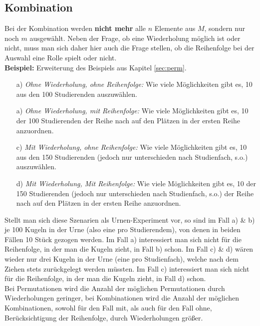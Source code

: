 \documentclass[a4paper]{article}
\newcommand\dangersign{%
 \makebox[1.8em][c]{%
 \makebox[0pt][c]{\raisebox{.15em}{\small!}}%
 \makebox[0pt][c]{\color{red}\Large$\triangle$}}}%
\begin{document}
\subsection{Kombination}
Bei der Kombination werden \textbf{nicht mehr} alle $n$ Elemente aus $M$, sondern nur noch $m$ ausgewählt. Neben der Frage, ob eine Wiederholung möglich ist oder nicht, muss man sich daher hier auch die Frage stellen, ob die Reihenfolge bei der Auswahl eine Rolle spielt oder nicht. \\
\textbf{Beispiel:} Erweiterung des Beispiels aus Kapitel \ref{sec:perm}.
\begin{itemize}
    \item[a)] \textit{Ohne Wiederholung, ohne Reihenfolge:} Wie viele Möglichkeiten gibt es, 10 aus den 100 Studierenden auszuwählen.
    \item[a)] \textit{Ohne Wiederholung, mit Reihenfolge:} Wie viele Möglichkeiten gibt es, 10 der 100 Studierenden der Reihe nach auf den Plätzen in der ersten Reihe anzuordnen.
    \item[c)] \textit{Mit Wiederholung, ohne Reihenfolge:} Wie viele Möglichkeiten gibt es, 10 aus den 150 Studierenden (jedoch nur unterschieden nach Studienfach, s.o.) auszuwählen.
    \item[d)] \textit{Mit Wiederholung, Mit Reihenfolge:} Wie viele Möglichkeiten gibt es, 10 der 150 Studierenden (jedoch nur unterschieden nach Studienfach, s.o.) der Reihe nach auf den Plätzen in der ersten Reihe anzuordnen.
\end{itemize}
Stellt man sich diese Szenarien als Urnen-Experiment vor, so sind im Fall a) \& b) je 100 Kugeln in der Urne (also eine pro Studierendem), von denen in beiden Fällen 10 Stück gezogen werden. Im Fall a) interessiert man sich nicht für die Reihenfolge, in der man die Kugeln zieht, in Fall b) schon. Im Fall c) \& d) wären wieder nur drei Kugeln in der Urne (eine pro Studienfach), welche nach dem Ziehen stets zurückgelegt werden müssten. Im Fall c) interessiert man sich nicht für die Reihenfolge, in der man die Kugeln zieht, in Fall d) schon.\\

\noindent \dangersign Bei Permutationen wird die Anzahl der möglichen Permutationen durch Wiederholungen geringer, bei Kombinationen wird die Anzahl der möglichen Kombinationen, sowohl für den Fall mit, als auch für den Fall ohne, Berücksichtigung der Reihenfolge, durch Wiederholungen größer.

\clearpage
\end{document}
